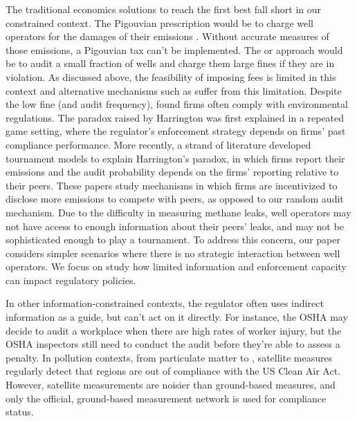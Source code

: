 \documentclass[12pt,oneside,letterpaper]{article}
\theoremstyle{definition}
\begin{document}
\begin{refsection}
The traditional economics solutions to reach the first best fall short in our constrained context.
The Pigouvian prescription would be to charge well operators for the damages of their emissions \parencite{Pigou:1932}.
Without accurate measures of those emissions, a Pigouvian tax can't be implemented.
The \textcite{Becker:1968} or \textcite{Polinsky/Shavell:1979} approach would be to audit a small fraction of wells and charge them large fines if they are in violation.
As discussed above, the feasibility of imposing fees is limited in this context and alternative mechanisms such as \textcite{Segerson:1988} suffer from this limitation.
Despite the low fine (and audit frequency), \textcite{Harrington:1988} found firms often comply with environmental regulations.
The paradox raised by Harrington was first explained in a repeated game setting, where the regulator's enforcement strategy depends on firms' past compliance performance.
More recently, a strand of literature
\parencite{%
Gilpatric/Vossler/McKee:2011,
gilpatric2015using,
Cason/Friesen/Gangadharan:2016,
oestreich2015firms,
Oestreich:2017,
}
developed tournament models to explain Harrington's paradox, in which firms report their emissions and the audit probability depends on the firms' reporting relative to their peers.
These papers study mechanisms in which firms are incentivized to disclose more emissions to compete with peers, as opposed to our random audit mechanism.
Due to the difficulty in measuring methane leaks, well operators may not have access to enough information about their peers' leaks, and may not be sophisticated enough to play a tournament.
To address this concern, our paper considers simpler scenarios where there is no strategic interaction between well operators.
We focus on study how limited information and enforcement capacity can impact regulatory policies.


In other information-constrained contexts, the regulator often uses indirect information as a guide, but can't act on it directly.
For instance, the \gls{OSHA} may decide to audit a workplace when there are high rates of worker injury, but the \gls{OSHA} inspectors still need to conduct the audit before they're able to assess a penalty.
In pollution contexts, from particulate matter to , satellite measures regularly detect that regions are out of compliance with the US Clean Air Act.
However, satellite measurements are noisier than ground-based measures, and only the official, ground-based measurement network is used for compliance status.


\end{refsection}
\end{document}
